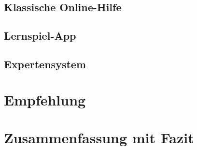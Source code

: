 \section{Klassische Online-Hilfe}

\section{Lernspiel-App}

\section{Expertensystem}
\label{ch:Content2}



\chapter{Empfehlung}

\chapter{Zusammenfassung mit Fazit}
